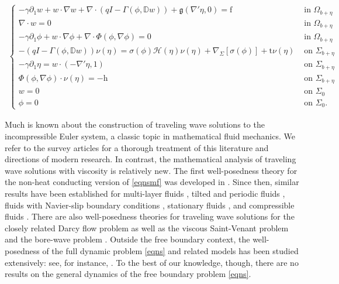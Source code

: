 \documentclass[11pt,letterpaper,reqno]{amsart}
\numberwithin{equation}{section}
\begin{document}
\begin{align} \label{eqnsmf}
    \begin{cases}
        -\gamma\partial_{1}w+w \cdot \nabla w + \nabla \cdot (qI - \Gamma(\phi,\mathbb{D}w)) +\mathfrak{g}(\nabla'\eta,0) = \mathrm{f}  &\mbox{ in \(\Omega_{b+\eta}\)} \\
        \nabla \cdot w = 0 &\mbox{ in \(\Omega_{b+\eta}\)} \\
        -\gamma\partial_{1} \phi + w \cdot \nabla \phi +\nabla \cdot \Phi(\phi,\nabla \phi) = 0 &\mbox{ in \(\Omega_{b+\eta}\)} \\
        -(qI - \Gamma(\phi,\mathbb{D}w))\nu(\eta) = \sigma(\phi)\mathcal{H}(\eta)\nu(\eta) + \nabla_{\Sigma}[\sigma(\phi)]+ \mathrm{t} \nu(\eta) &\mbox{ on \(\Sigma_{b+\eta}\)} \\
        -\gamma\partial_{1}\eta = w \cdot (-\nabla ' \eta,1) &\mbox{ on \(\Sigma_{b+\eta}\)} \\
        \Phi(\phi,\nabla\phi)\cdot \nu(\eta) = -\mathrm{h} &\mbox{ on \(\Sigma_{b+\eta}\)} \\
        w = 0 &\mbox{ on \(\Sigma_{0}\)} \\
        \phi = 0 &\mbox{ on \(\Sigma_{0}\)}.
    \end{cases}
\end{align}


Much is known about the construction of traveling wave solutions to the incompressible Euler system, a classic topic in mathematical fluid mechanics. We refer to the survey articles \cite{Toland_1996,Groves_2004,Strauss_2010,HHSTWWW_2022} for a thorough treatment of this literature and directions of modern research.  In contrast, the mathematical analysis of traveling wave solutions with viscosity is relatively new.  The first well-posedness theory for the non-heat conducting version of \eqref{eqnsmf} was developed in \cite{leoni2023traveling}. Since then, similar results have been established for multi-layer fluids \cite{MR4337506}, tilted and periodic fluids \cite{MR4609068,nguyen_Banihashemi_2025}, fluids with Navier-slip boundary conditions \cite{MR4785303}, stationary fluids \cite{MR4787851}, 
and compressible fluids \cite{stevenson2023wellposedness}. There are also well-posedness theories for traveling wave solutions for the closely related Darcy flow problem \cite{MR4690615,Nguyen_2026,MR4797733,nguyen_stevenson_2025} as well as the viscous Saint-Venant problem \cite{stevenson2023shallow,stev_tice_big_waves} and the bore-wave problem \cite{stev_tice_bore_waves}. Outside the free boundary context, the well-posedness of the full dynamic problem \eqref{eqns} and related models  has been studied extensively: see, for instance,  \cite{MR1373218,MR2410236,MR3280824,MR3680944,MR3828345,MR3794117,MR3850090,MR3904564,MR4172578,MR4423144,MR4357119,MR4896668}.  To the best of our knowledge, though, there are no results on the general dynamics of the free boundary problem \eqref{eqns}.
\end{document}
